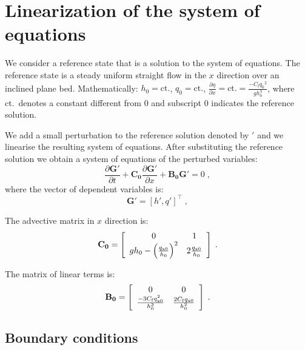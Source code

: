 \documentclass{deltares_report_elv}
\newcommand{\mathsub}[2]{#1_{\mathrm{#2}}}
\begin{document}
\section{Linearization of the system of equations}

We consider a reference state that is a solution to the system of equations. The reference state is a steady uniform straight flow in the $x$ direction over an inclined plane bed. Mathematically: $h_0=\text{ct.}$, $q_0=\text{ct.}$, $\frac{\partial \eta}{\partial x}=\text{ct.}=\frac{-\mathsub{C}{f}{q_0}^2}{gh_0^3}$, where ct.\ denotes a constant different from 0 and subscript $0$ indicates the reference solution. 

We add a small perturbation to the reference solution denoted by $'$ and we linearise the resulting system of equations. After substituting the reference solution we obtain a system of equations of the perturbed variables:
\begin{equation}
\label{eq:matrixf_sf}
	\frac{\partial \mathbf{G'}}{\partial t}+\mathbf{C_{0}}\frac{\partial \mathbf{G'}}{\partial x}+\mathbf{B_0}\mathbf{G'}=0 \;,
\end{equation}
where the vector of dependent variables is:
\begin{equation}
\label{eq:Q_l}
	\mathbf{G'}=\left[h',q'\right]^{\intercal} \;,
\end{equation}

The advective matrix in $x$ direction is:
\begin{equation}
\label{eq:Ax_sf}
\makebox[\textwidth][c]{$
		\mathbf{C_{0}}=\left[
 \begin{array}{cc}
  0 & 1  \\
	gh_0-\left(\frac{q_{\mathrm{x}0}}{h_0}\right)^2 & 2\frac{q_{\mathrm{x}0}}{h_0} \\
 \end{array}\right] \;.
$}
\end{equation}

The matrix of linear terms is:
\begin{equation}
\label{eq:B}
\makebox[\textwidth][c]{$
		\mathbf{B_0}=\left[
		\begin{array}{cc}
  0 & 0 \\
	\frac{-3C_{\mathrm{f}}q_{\mathrm{x}0}^2}{h_0^3} & \frac{2C_{\mathrm{f}}q_{\mathrm{x}0}}{h_0^2} \\
 \end{array}\right] \;.
$}
\end{equation}

\subsection{Boundary conditions}
\end{document}
